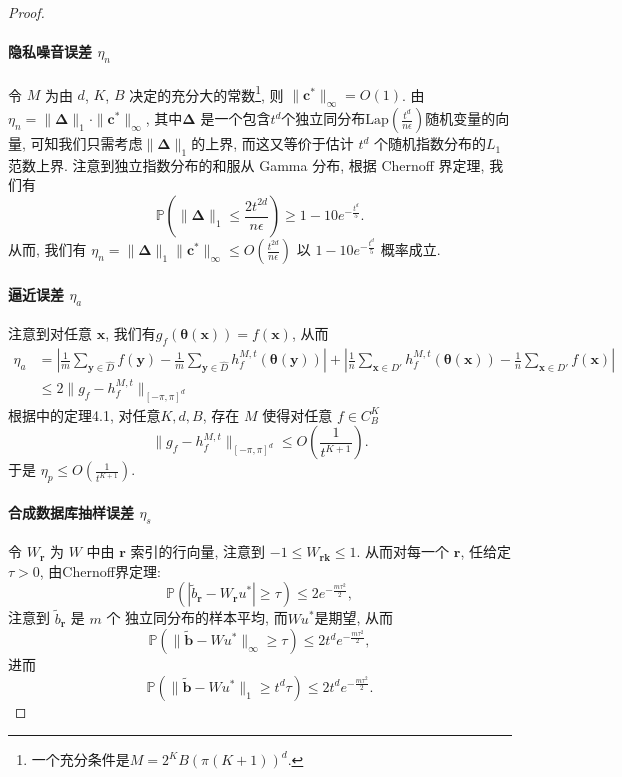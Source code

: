 \begin{proof}
\paragraph{隐私噪音误差 $\eta_n$} %
\label{par:隐私噪音误差_eta_n_}
令 $M$ 为由 $d$, $K$, $B$ 决定的充分大的常数\footnote{一个充分条件是$M = 2^KB(\pi (K+1))^d$.}, 则 $\|\mathbf{c}^*\|_{\infty} = O(1)$. 由 $\eta_n = \|\boldsymbol{\Delta}\|_1 \cdot \|\mathbf{c}^*\|_{\infty}$, 其中$\boldsymbol{\Delta}$ 是一个包含$t^d$个独立同分布$\mathrm{Lap}\left( \frac{t^d}{n \epsilon} \right)$随机变量的向量, 可知我们只需考虑$\|\boldsymbol{\Delta}\|_1$的上界,  而这又等价于估计 $t^d$ 个随机指数分布的$L_1$范数上界. 注意到独立指数分布的和服从 Gamma 分布, 根据 Chernoff 界定理, 我们有
\begin{equation*}
  \mathbb{P} \left(\|\boldsymbol{\Delta} \|_{1}\leq \frac{2t^{2d}}{n\epsilon} \right) \geq 1-10e^{-\frac{t^d}{5}}.
\end{equation*}
从而, 我们有 $\eta_n  =\|\boldsymbol{\Delta}\|_{1}\|\mathbf{c}^*\|_{\infty}\leq O \left(\frac{t^{2d}}{n\epsilon} \right)$ 以 $1-10e^{-\frac{t^d}{5}}$ 概率成立.
\paragraph{逼近误差 $\eta_a$} %
\label{par:逼近误差_eta_a_}
注意到对任意 $\mathbf{x}$, 我们有$g_f(\boldsymbol{\theta}(\mathbf{x}))=f(\mathbf{x})$, 从而
\begin{align*}
\eta_a &= \left|\frac{1}{m}\sum_{\mathbf{y}\in \hat{D}}f(\mathbf{y}) -  \frac{1}{m}\sum_{\mathbf{y}\in \hat{D}} h_f^{M,t}\left( \boldsymbol{\theta}(\mathbf{y}) \right) \right| \nonumber + \left|\frac{1}{n}\sum_{\mathbf{x}\in D'} h_f^{M,t}\left( \boldsymbol{\theta}(\mathbf{x}) \right) - \frac{1}{n}\sum_{\mathbf{x}\in D'} f(\mathbf{x})  \right|\\
& \le 2 \big \|g_f - h_f^{M,t} \big \|_{[-\pi,\pi]^d}
\end{align*}
根据\parencite{wang2013efficient}中的定理4.1, 对任意$K,d,B$, 存在 $M$ 使得对任意 $f \in C_B^K$
\[
\|g_f - h_f^{M,t} \|_{[-\pi,\pi]^d} \le O \left(\frac{1}{t^{K+1}}\right).
\]
于是 $\eta_p \leq O \left(\frac{1}{t^{K+1}} \right)$.
\paragraph{合成数据库抽样误差 $\eta_s$} %
\label{par:合成数据库抽样误差_eta_s_}
令 $W_{\mathbf{r}}$ 为 $W$ 中由 $\mathbf{r}$ 索引的行向量, 注意到 $-1 \le W_{\mathbf{rk}} \le 1$. 从而对每一个 $\mathbf{r}$, 任给定 $\tau>0$, 由Chernoff界定理:
\[
\mathbb{P} \left( |\tilde{b}_{\mathbf{r}} - W_{\mathbf{r}}u^*| \ge \tau \right) \le 2 e^{-\frac{m \tau^2}{2}},
\]
注意到 $\tilde {b}_{\mathbf{r}}$ 是 $m$ 个 独立同分布的样本平均, 而$Wu^*$是期望, 从而
\[
\mathbb{P} \left( \|\tilde{\mathbf{b}} - Wu^* \|_{\infty} \ge \tau \right) \le 2t^d e^{-\frac{m \tau^2}{2}},
\]
进而
\[
\mathbb{P} \left( \|\tilde{\mathbf{b}} - Wu^* \|_{1} \ge t^d \tau \right) \le 2t^d e^{-\frac{m \tau^2}{2}}.
\]


\end{proof}
